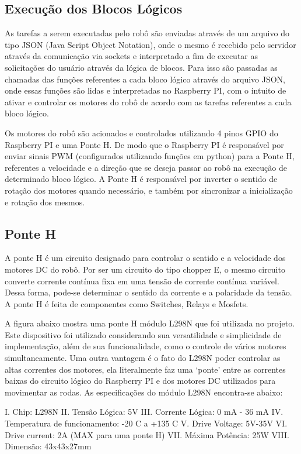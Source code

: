 \subsection{Execução dos Blocos Lógicos}

As tarefas a serem executadas pelo robô são enviadas através de um arquivo do tipo JSON (Java Script Object Notation), onde o mesmo é recebido pelo servidor através da comunicação via sockets e interpretado a fim de executar as solicitações do usuário através da lógica de blocos. Para isso são passadas as chamadas das funções referentes a cada bloco lógico através do arquivo JSON, onde essas funções são lidas e interpretadas no Raspberry PI, com o intuito de ativar e controlar os motores do robô de acordo com as tarefas referentes a cada bloco lógico.

Os motores do robô são acionados e controlados utilizando 4 pinos GPIO do Raspberry PI e uma Ponte H. De modo que o Raspberry PI é responsável por enviar sinais PWM (configurados utilizando funções em python) para a Ponte H, referentes a velocidade e a direção que se deseja passar ao robô na execução de determinado bloco lógico. A Ponte H é responsável por inverter o sentido de rotação dos motores quando necessário, e também por sincronizar a inicialização e rotação dos mesmos.

\subsection{Ponte H}

A ponte H é um circuito designado para controlar o sentido e a velocidade dos motores DC do robô. Por ser um circuito do tipo chopper E, o mesmo circuito converte corrente contínua fixa em uma tensão de corrente contínua variável. Dessa forma, pode-se determinar o sentido da corrente e a polaridade da tensão. A ponte H é feita de componentes como Switches, Relays e Mosfets.

A figura abaixo mostra uma ponte H módulo L298N que foi utilizada no projeto. Este dispositivo foi utilizado considerando sua versatilidade e simplicidade de implementação, além de sua funcionalidade, como o controle de vários motores simultaneamente. Uma outra vantagem é o fato do L298N poder controlar as altas correntes dos motores, ela literalmente faz uma ‘ponte’ entre as correntes baixas do circuito lógico do Raspberry PI e dos motores DC utilizados para movimentar as rodas. As especificações do módulo L298N encontra-se abaixo:

I.	Chip: L298N
II.	Tensão Lógica: 5V
III.	Corrente Lógica: 0 mA - 36 mA
IV.	Temperatura de funcionamento: -20 C a +135 C
V.	Drive Voltage: 5V-35V
VI.	Drive current: 2A (MAX para uma ponte H)
VII.	Máxima Potência: 25W
VIII.	Dimensão: 43x43x27mm

